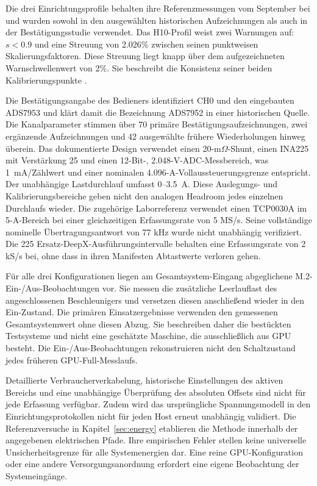 Die drei Einrichtungsprofile behalten ihre Referenzmessungen vom September bei und wurden sowohl in den ausgewählten historischen Aufzeichnungen als auch in der Bestätigungsstudie verwendet. Das H10-Profil weist zwei Warnungen auf: $s<\num{0.9}$ und eine Streuung von \num{2.026}\% zwischen seinen punktweisen Skalierungsfaktoren. Diese Streuung liegt knapp über dem aufgezeichneten Warnschwellenwert von 2\%. Sie beschreibt die Konsistenz seiner beiden Kalibrierungspunkte \cite{v49Confirmation2026}.

\begingroup\setlength{\emergencystretch}{1em}
Die Bestätigungsangabe des Bedieners identifiziert CH0 und den eingebauten ADS7953 und klärt damit die Bezeichnung ADS7952 in einer historischen Quelle. Die Kanalparameter stimmen über 70 primäre Bestätigungsaufzeichnungen, zwei ergänzende Aufzeichnungen und 42 ausgewählte frühere Wiederholungen hinweg überein. Das dokumentierte Design verwendet einen 20-m$\Omega$-Shunt, einen INA225 mit Verstärkung 25 und einen 12-Bit-, \num{2.048}-V-ADC-Messbereich, was 1~mA/Zählwert und einer nominalen \num{4.096}-A-Vollaussteuerungsgrenze entspricht. Der unabhängige Lastdurchlauf umfasst 0--\num{3.5}~A. Diese Auslegungs- und Kalibrierungsbereiche geben nicht den analogen Headroom jedes einzelnen Durchlaufs wieder. Die zugehörige Laborreferenz verwendet einen TCP0030A im 5-A-Bereich bei einer gleichzeitigen Erfassungsrate von 5 MS/s. Seine vollständige nominelle Übertragungsantwort von 77 kHz wurde nicht unabhängig verifiziert. Die 225 Ersatz-DeepX-Ausführungsintervalle behalten eine Erfassungsrate von 2 kS/s bei, ohne dass in ihren Manifesten Abtastwerte verloren gehen.
\par\endgroup

Für alle drei Konfigurationen liegen am Gesamtsystem-Eingang abgeglichene M.2-Ein-/Aus-Beobachtungen vor. Sie messen die zusätzliche Leerlauflast des angeschlossenen Beschleunigers und versetzen diesen anschließend wieder in den Ein-Zustand. Die primären Einsatzergebnisse verwenden den gemessenen Gesamtsystemwert ohne diesen Abzug. Sie beschreiben daher die bestückten Testsysteme und nicht eine geschätzte Maschine, die ausschließlich aus GPU besteht. Die Ein-/Aus-Beobachtungen rekonstruieren nicht den Schaltzustand jedes früheren GPU-Full-Messlaufs.

Detaillierte Verbraucherverkabelung, historische Einstellungen des aktiven Bereichs und eine unabhängige Überprüfung des absoluten Offsets sind nicht für jede Erfassung verfügbar. Zudem wird das ursprüngliche Spannungsmodell in den Einrichtungsprotokollen nicht für jeden Host erneut unabhängig validiert. Die Referenzversuche in Kapitel~\ref{sec:energy} etablieren die Methode innerhalb der angegebenen elektrischen Pfade. Ihre empirischen Fehler stellen keine universelle Unsicherheitsgrenze für alle Systemenergien dar. Eine reine GPU-Konfiguration oder eine andere Versorgungsanordnung erfordert eine eigene Beobachtung der Systemeingänge.

